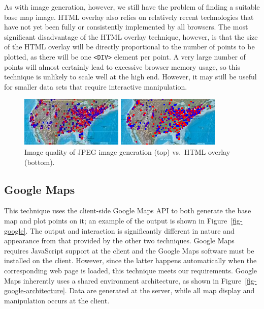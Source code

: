 \documentclass[acmtocl,acmnow]{acmtrans2m}
\begin{document}
As with image generation, however, we still have the problem of finding
a suitable base map image. HTML overlay also relies on relatively recent
technologies that have not yet been fully or consistently implemented by
all browsers. The most significant disadvantage of the HTML overlay
technique, however, is that the size of the HTML overlay will be
directly proportional to the number of points to be plotted, as there
will be one \verb|<DIV>| element per point. A very large number of
points will almost certainly lead to excessive browser memory usage, so
this technique is unlikely to scale well at the high end. However, it
may still be useful for smaller data sets that require interactive
manipulation.


\begin{figure}
	\begin{center}
		\includegraphics[scale=1.25]{gd_detail}\medskip
		
		\includegraphics[scale=1.25]{html_detail}
	\end{center}
	\caption{Image quality of JPEG image generation (top) vs.\ HTML
	overlay (bottom).}
	\label{fig-image-quality}
\end{figure}


\subsection{Google Maps}
\label{sec-google}

This technique uses the client-side Google Maps API
\cite{Goog-M-2006-maps} to both generate the base map and plot points on
it; an example of the output is shown in Figure~\ref{fig-google}. The
output and interaction is significantly different in nature and
appearance from that provided by the other two techniques. Google Maps
requires JavaScript support at the client and the Google Maps software
must be installed on the client. However, since the latter happens
automatically when the corresponding web page is loaded, this technique
meets our requirements. Google Maps inherently uses a shared environment
architecture, as shown in Figure~\ref{fig-google-architecture}. Data are
generated at the server, while all map display and manipulation occurs
at the client.
\end{document}
